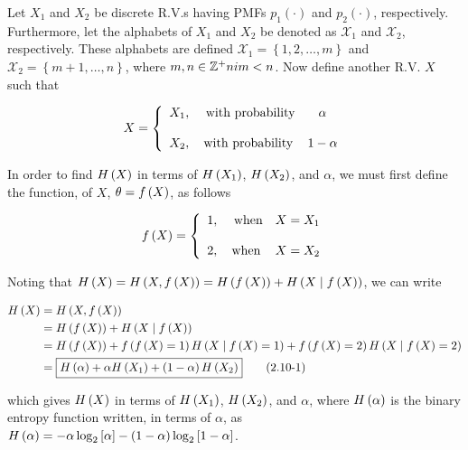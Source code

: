 \documentclass[ClusteringConnectionsMAIN.tex]{subfiles}
\begin{document}
	

  Let $X_1$ and $X_2$ be discrete R.V.s having PMFs $p_1 \left( \cdot \right)$ and $p_2  \left( \cdot \right)$, respectively.  Furthermore, let the alphabets of $X_1$ and $X_2$ be denoted as $\mathcal{X}_1$ and $\mathcal{X}_2$, respectively.  These alphabets are defined $\mathcal{X}_1 = \left\{ 1, 2, \dots, m \right\}$ and $\mathcal{X}_2 = \left\{ m + 1, \dots, n \right\}$, where $m, n \in \mathbb{Z}^+ ni m < n$.  Now define another R.V. $X$ such that

\begin{align}
X = \left\{ \begin{array}{l c c}
X_1, &\ \text{with probability} & \alpha \\ 
 & & \\
X_2, & \text{with probability} & 1 - \alpha 
\end{array}\right. \notag
\end{align}

In order to find $H \left( X \right)$ in terms of $H \left( X_1 \right)$, $H \left( X_2 \right)$, and $\alpha$, we must first define the function, of $X$, $\theta = f \left( X \right)$,  as follows

\begin{align} 
f \left( X \right) = \left\{ \begin{array}{l c c}
1, &\ \text{when} & X = X_1 \\ 
& & \\
2, & \text{when} & X = X_2
\end{array}\right.  \notag
\end{align}

Noting that $H \left( X \right) = H \left( X, f \left( X \right) \right) = H \left( f \left( X \right) \right) + H \left( X \mid f \left( X \right) \right)$, we can write

\begin{align}  \label{c2p10eq1}
H \left( X \right) &= H \left( X, f \left( X \right) \right)   \notag \\
&= H \left( f \left( X \right) \right) + H \left( X \mid f \left( X \right) \right)  \notag \\
&= H \left( f \left( X \right) \right) + f \left( f \left( X \right) = 1 \right) H \left( X \mid f \left( X \right) = 1 \right) + f \left( f \left( X \right) = 2 \right) H \left( X \mid f \left( X \right) = 2 \right)  \notag \\
&= \boxed{ H \left( \alpha \right) + \alpha H \left( X_1 \right) + \left( 1 - \alpha \right) H \left( X_2 \right) }   \tag{2.10-1}
\end{align}

which gives $H \left( X \right)$ in terms of $H \left( X_1 \right)$, $H \left( X_2 \right)$, and $\alpha$, where $H \left(  \alpha  \right)$ is the binary entropy function written, in terms of $\alpha$, as $H \left(  \alpha  \right) = - \alpha \log_2 \left[ \alpha \right] - \left( 1 - \alpha \right) \log_2 \left[ 1 - \alpha \right]$.
\end{document}
